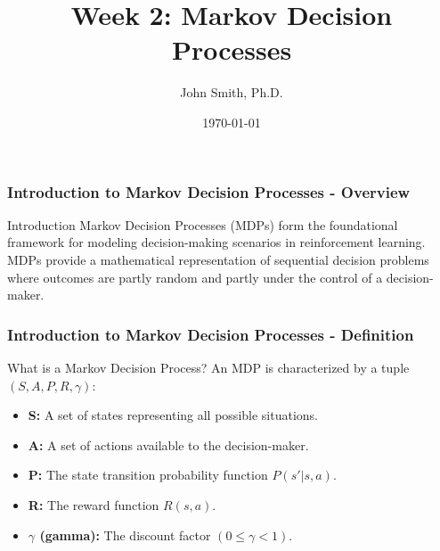 \documentclass[aspectratio=169]{beamer}
\title[Week 2: MDPs]{Week 2: Markov Decision Processes}
\author[John Smith]{John Smith, Ph.D.}
\institute[University Name]{Department of Computer Science \\ University Name \\ Email: email@university.edu}
\date{\today}
\begin{document}
\frame{\titlepage}

\begin{frame}[fragile]
    \frametitle{Introduction to Markov Decision Processes - Overview}
    \begin{block}{Introduction}
        Markov Decision Processes (MDPs) form the foundational framework for modeling decision-making scenarios in reinforcement learning. MDPs provide a mathematical representation of sequential decision problems where outcomes are partly random and partly under the control of a decision-maker.
    \end{block}
\end{frame}

\begin{frame}[fragile]
    \frametitle{Introduction to Markov Decision Processes - Definition}
    \begin{block}{What is a Markov Decision Process?}
        An MDP is characterized by a tuple \( (S, A, P, R, \gamma) \):
        \begin{itemize}
            \item \textbf{S:} A set of states representing all possible situations.
            \item \textbf{A:} A set of actions available to the decision-maker.
            \item \textbf{P:} The state transition probability function \( P(s' | s, a) \).
            \item \textbf{R:} The reward function \( R(s, a) \).
            \item \textbf{$\gamma$ (gamma):} The discount factor \( (0 \leq \gamma < 1) \).
        \end{itemize}
    \end{block}
\end{frame}
\end{document}
